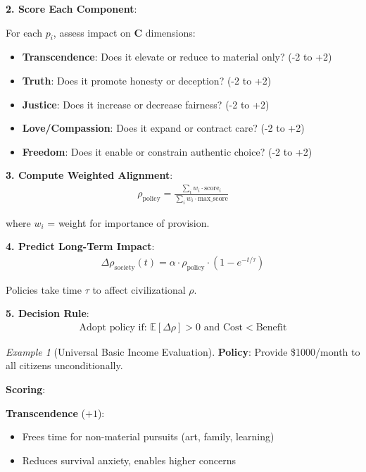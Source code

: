 \documentclass[11pt,a4paper]{article}
\theoremstyle{definition}
\theoremstyle{remark}
\newtheorem{example}{Example}[section]
\begin{document}
\begin{small}
\begin{enumerate}
\begin{protocol}
\textbf{2. Score Each Component}:

For each \(p_i\), assess impact on \(\mathbf{C}\) dimensions:
\begin{itemize}
    \item \textbf{Transcendence}: Does it elevate or reduce to material only? (-2 to +2)
    \item \textbf{Truth}: Does it promote honesty or deception? (-2 to +2)
    \item \textbf{Justice}: Does it increase or decrease fairness? (-2 to +2)
    \item \textbf{Love/Compassion}: Does it expand or contract care? (-2 to +2)
    \item \textbf{Freedom}: Does it enable or constrain authentic choice? (-2 to +2)
\end{itemize}

\textbf{3. Compute Weighted Alignment}:
\begin{align}
\rho_{\text{policy}} = \frac{\sum_i w_i \cdot \text{score}_i}{\sum_i w_i \cdot \text{max\_score}}
\end{align}

where \(w_i\) = weight for importance of provision.

\textbf{4. Predict Long-Term Impact}:
\begin{align}
\Delta \rho_{\text{society}}(t) = \alpha \cdot \rho_{\text{policy}} \cdot (1 - e^{-t/\tau})
\end{align}

Policies take time \(\tau\) to affect civilizational \(\rho\).

\textbf{5. Decision Rule}:
\begin{align}
\text{Adopt policy if: } \mathbb{E}[\Delta \rho] > 0 \text{ and } \text{Cost} < \text{Benefit}
\end{align}
\end{protocol}

\begin{example}[Universal Basic Income Evaluation]
\textbf{Policy}: Provide \$1000/month to all citizens unconditionally.

\textbf{Scoring}:

\textbf{Transcendence} (\(+1\)): 
\begin{itemize}
    \item Frees time for non-material pursuits (art, family, learning)
    \item Reduces survival anxiety, enables higher concerns
\end{itemize}


\end{example}
\end{enumerate}
\end{small}
\end{document}
